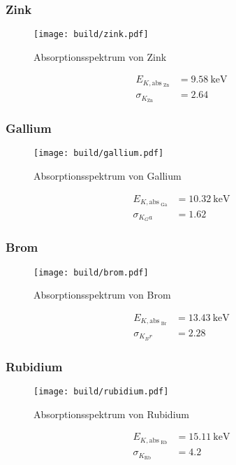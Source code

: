 \subsubsection{Zink}
\begin{figure}
    \centering
    \caption{Absorptionsspektrum von Zink}
    \label{fig:zink}
    \texttt{[image: build/zink.pdf]}
\end{figure}
\begin{align*}
    E_{K, \text{abs}_\text{ Zn}}  &= \SI{9.58}{\kilo\electronvolt} \\
    \sigma_{K_\text{Zn}}         &= \num{2.64}
\end{align*}
\subsubsection{Gallium}
\begin{figure}
    \centering
    \caption{Absorptionsspektrum von Gallium}
    \label{fig:Gallium}
    \texttt{[image: build/gallium.pdf]}
\end{figure}
\begin{align*}
    E_{K, \text{abs}_\text{ Ga}}  &= \SI{10.32}{\kilo\electronvolt} \\
    \sigma_{K_Ga}                &= \num{1.62}
\end{align*}
\subsubsection{Brom}
\begin{figure}
    \centering
    \caption{Absorptionsspektrum von Brom}
    \label{fig:Brom}
    \texttt{[image: build/brom.pdf]}
\end{figure}
\begin{align*}
    E_{K, \text{abs}_\text{ Br}}  &= \SI{13.43}{\kilo\electronvolt} \\
    \sigma_{K_Br}                &= \num{2.28}
\end{align*}
\subsubsection{Rubidium}
\begin{figure}
    \centering
    \caption{Absorptionsspektrum von Rubidium}
    \label{fig:Rubidium}
    \texttt{[image: build/rubidium.pdf]}
\end{figure}
\begin{align*}
    E_{K, \text{abs}_\text{ Rb}}  &= \SI{15.11}{\kilo\electronvolt} \\
    \sigma_{K_\text{Rb}}         &= \num{4.2}
\end{align*}
